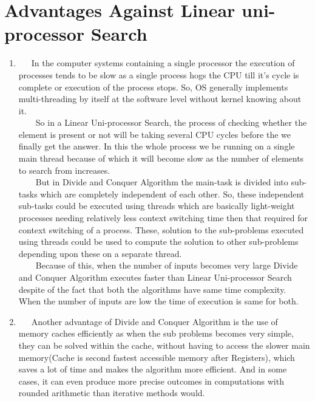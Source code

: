 \documentclass[conference]{IEEEtran}
\begin{document}
\section{Advantages Against Linear uni-processor Search}
\begin{enumerate}
    \item \ \ \ In the computer systems containing a single processor the execution of processes tends to be slow as a single process hogs the CPU till it's cycle is complete or execution of the process stops. So, OS generally implements multi-threading by itself at the software level without kernel knowing about it.\\

\ \ \ \ So in a Linear Uni-processor Search, the process of checking whether the element is present or not will be taking several CPU cycles before the we finally get the answer. In this the whole process we be running on a single main thread because of which it will become slow as the number of elements to search from increases.\\

\ \ \ \ But in Divide and Conquer Algorithm the main-task is divided into sub-tasks which are completely independent of each other. So, these independent sub-tasks could be executed using threads which are basically light-weight processes needing relatively less context switching time then that required for context switching of a process. These, solution to the sub-problems executed using threads could be used to compute the solution to other sub-problems depending upon these on a separate thread.\\

\ \ \ \ Because of this, when the number of inputs becomes very large Divide and Conquer Algorithm executes faster than Linear Uni-processor Search despite of the fact that both the algorithms have same time complexity. When the number of inputs are low the time of execution is same for both.\\
\item \ \ \ Another advantage of Divide and Conquer Algorithm is the use of memory caches efficiently as when the sub problems becomes very simple, they can be solved within the cache, without having to access the slower main memory(Cache is second fastest accessible memory after Registers), which saves a lot of time and makes the algorithm more efficient. And in some cases, it can even produce more precise outcomes in computations with rounded arithmetic than iterative methods would.
\end{enumerate}
\end{document}
